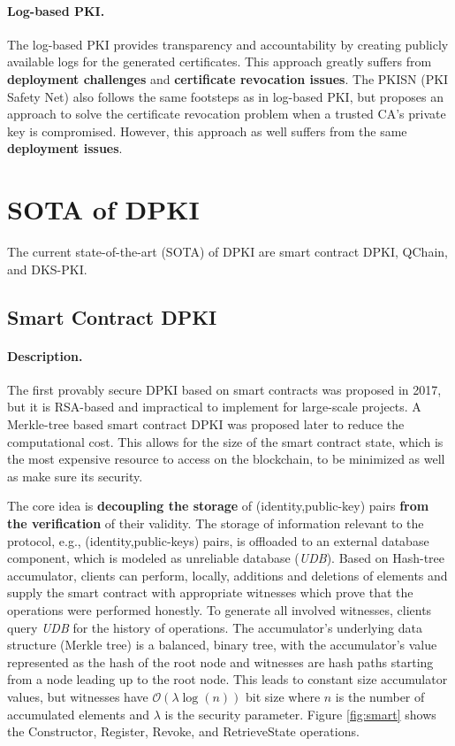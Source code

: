 \documentclass[lang=en]{sjtuarticle}
\begin{document}
\paragraph{Log-based PKI.} The log-based PKI provides
transparency and accountability by creating publicly available logs for the generated
certificates. This approach greatly suffers from \textbf{deployment challenges} and
\textbf{certificate revocation issues}. The PKISN (PKI Safety Net) \cite{Szalachowski2016} also follows the same footsteps as in log-based PKI, but proposes an approach to solve the certificate revocation problem when a
trusted CA's private key is compromised. However, this approach as well suffers from the same
\textbf{deployment issues}.

\section{SOTA of DPKI}

The current state-of-the-art (SOTA) of DPKI are smart contract DPKI, QChain, and DKS-PKI.

\subsection{Smart Contract DPKI}

\paragraph{Description.}

The first provably secure DPKI based on smart contracts \cite{patsonakis2018towards} was proposed in 2017, but it is RSA-based and impractical to implement for large-scale projects. A Merkle-tree based smart contract DPKI \cite{Patsonakis2019} was proposed later to reduce the computational cost. This allows for the size of the smart contract state, which is the most expensive resource to access on the
blockchain, to be minimized as well as make sure its security.

The core idea is \textbf{decoupling the storage} of (identity,public-key)
pairs \textbf{from the verification} of their validity. The storage of information relevant to the protocol, e.g.,
(identity,public-keys) pairs, is offloaded to an external database
component, which is modeled as unreliable database (\textit{UDB}). Based on Hash-tree accumulator, clients can perform, locally, additions and deletions of elements and supply the smart contract
with appropriate witnesses which prove that the operations
were performed honestly. To generate all involved witnesses,
clients query \textit{UDB} for the history of operations. The accumulator's underlying data structure (Merkle tree) is a balanced,
binary tree, with the accumulator's value represented as the hash of the root node and witnesses are
hash paths starting from a node leading up to the root node. This leads to constant size accumulator
values, but witnesses have $\mathcal{O}(\lambda\log(n))$ bit size where $n$ is the number of accumulated elements and $\lambda$ is the security parameter. Figure \ref{fig:smart} shows the \textsf{Constructor}, \textsf{Register}, \textsf{Revoke}, and \textsf{RetrieveState} operations.
\end{document}
